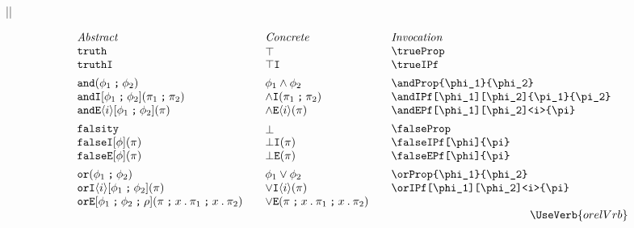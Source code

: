 \documentclass[11pt]{article}
\begin{document}
||
\begin{figure}

  \begin{small}
    \begin{displaymath}
      \begin{array}{l@{\qquad}l@{\qquad}l@{\qquad}l}
        \textit{Abstract} & \textit{Concrete} & \textit{Invocation} \\
        \trueProp                                       & \trueProp*                       & \verb|\trueProp|                                       \\
        \trueIPf                                        & \trueIPf*                        & \verb|\trueIPf|                                        \\[1ex]

        \andProp{\phi_1}{\phi_2}                        & \andProp*{\phi_1}{\phi_2}        & \verb|\andProp{\phi_1}{\phi_2}|                        \\
        \andIPf[\phi_1][\phi_2]{\pi_1}{\pi_2}                           & \andIPf*{\pi_1}{\pi_2}           & \verb|\andIPf[\phi_1][\phi_2]{\pi_1}{\pi_2}|                           \\
        \andEPf[\phi_1][\phi_2]<i>{\pi}                 & \andEPf*<i>{\pi}                 & \verb|\andEPf[\phi_1][\phi_2]<i>{\pi}|                 \\[1ex]

        \falseProp                                      & \falseProp*                      & \verb|\falseProp|                                      \\
        \falseIPf[\phi]{\pi}                            & \falseIPf*{\pi}                  & \verb|\falseIPf[\phi]{\pi}|                            \\
        \falseEPf[\phi]{\pi}                            & \falseEPf*{\pi}                  & \verb|\falseEPf[\phi]{\pi}|                            \\[1ex]

        \orProp{\phi_1}{\phi_2}                         & \orProp*{\phi_1}{\phi_2}         & \verb|\orProp{\phi_1}{\phi_2}|                         \\
        \orIPf[\phi_1][\phi_2]<i>{\pi}                  & \orIPf*<i>{\pi}                  & \verb|\orIPf[\phi_1][\phi_2]<i>{\pi}|                 \\
        \orEPf[\phi_1][\phi_2][\rho]{\pi}{x}{\pi_1}{x}{\pi_2} &
        \orEPf*{\pi}{x}{\pi_1}{x}{\pi_2} & \\
        \multicolumn{3}{r}{\UseVerb{orelVrb}} \\[1ex]


\end{array}
\end{displaymath}
\end{small}
\end{figure}
\end{document}
